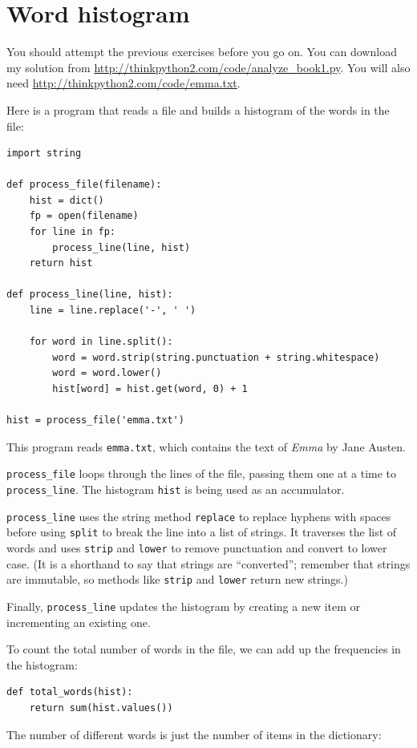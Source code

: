 \documentclass[10pt]{book}
\begin{document}
\section{Word histogram}

You should attempt the previous exercises before you go on.
You can download my solution from
 \url{http://thinkpython2.com/code/analyze_book1.py}.  You will
also need \url{http://thinkpython2.com/code/emma.txt}.

Here is a program that reads a file and builds a histogram of the
words in the file:

\begin{verbatim}
import string

def process_file(filename):
    hist = dict()
    fp = open(filename)
    for line in fp:
        process_line(line, hist)
    return hist

def process_line(line, hist):
    line = line.replace('-', ' ')
    
    for word in line.split():
        word = word.strip(string.punctuation + string.whitespace)
        word = word.lower()
        hist[word] = hist.get(word, 0) + 1

hist = process_file('emma.txt')
\end{verbatim}
%
This program reads {\tt emma.txt}, which contains the text of {\em
  Emma} by Jane Austen.

\verb"process_file" loops through the lines of the file,
passing them one at a time to \verb"process_line".  The histogram
{\tt hist} is being used as an accumulator.

\verb"process_line" uses the string method {\tt replace} to replace
hyphens with spaces before using {\tt split} to break the line into a
list of strings.  It traverses the list of words and uses {\tt strip}
and {\tt lower} to remove punctuation and convert to lower case.  (It
is a shorthand to say that strings are ``converted''; remember that
strings are immutable, so methods like {\tt strip} and {\tt lower}
return new strings.)

Finally, \verb"process_line" updates the histogram by creating a new
item or incrementing an existing one.

To count the total number of words in the file, we can add up
the frequencies in the histogram:

\begin{verbatim}
def total_words(hist):
    return sum(hist.values())
\end{verbatim}
%
The number of different words is just the number of items in
the dictionary:
\end{document}
